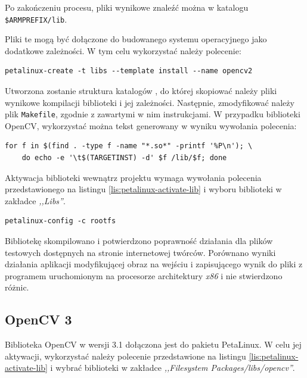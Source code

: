 Po zakończeniu procesu, pliki wynikowe znaleźć można w katalogu \texttt{\$ARMPREFIX/lib}.

Pliki te mogą być dołączone do budowanego systemu operacyjnego jako dodatkowe zależności. %
W tym celu wykorzystać należy polecenie:

\begin{lstlisting}[breaklines=true]
petalinux-create -t libs --template install --name opencv2
\end{lstlisting}

Utworzona zostanie struktura katalogów , do której skopiować należy pliki wynikowe kompilacji biblioteki i jej zależności. 
Następnie, zmodyfikować należy plik \texttt{Makefile}, zgodnie z zawartymi w nim instrukcjami. 
W przypadku biblioteki OpenCV, wykorzystać można tekst generowany w wyniku wywołania polecenia:

\begin{lstlisting}[breaklines=true]
for f in $(find . -type f -name "*.so*" -printf '%P\n'); \
	do echo -e '\t$(TARGETINST) -d' $f /lib/$f; done
\end{lstlisting}

Aktywacja biblioteki wewnątrz projektu wymaga wywołania polecenia przedstawionego na listingu \ref{lis:petalinux-activate-lib} i wyboru biblioteki w zakładce \textit{,,Libs''}. 

\begin{lstlisting}[caption=Dołączenie biblioteki do projektu PetaLinux., label=lis:petalinux-activate-lib]
petalinux-config -c rootfs
\end{lstlisting}


Bibliotekę skompilowano i potwierdzono poprawność działania dla plików testowych dostępnych na stronie internetowej twórców. Porównano wyniki działania aplikacji modyfikującej obraz na wejściu i zapisującego wynik do pliki z programem uruchomionym na procesorze architektury \emph{x86} i nie stwierdzono różnic.

\subsection{OpenCV 3}
Biblioteka OpenCV w wersji 3.1 dołączona jest do pakietu PetaLinux. 
W celu jej aktywacji, wykorzystać należy polecenie przedstawione na listingu \ref{lis:petalinux-activate-lib} i wybrać biblioteki w zakładce \emph{,,Filesystem Packages/libs/opencv''}.

